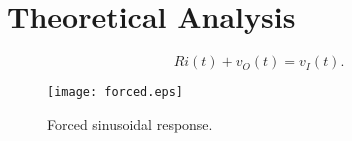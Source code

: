 \section{Theoretical Analysis}
\label{sec:analysis}


\begin{equation}
  Ri(t) + v_O(t) = v_I(t).
  \label{eq:kvl}
\end{equation}

\begin{figure}[h] \centering
\texttt{[image: forced.eps]}
\caption{Forced sinusoidal response.}
\label{fig:forced}
\end{figure}


